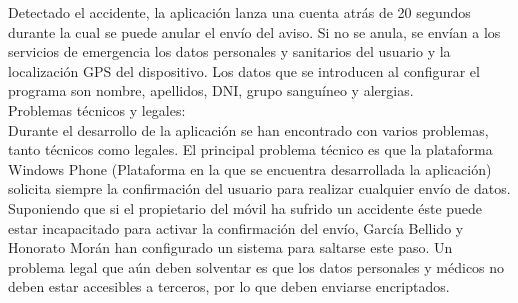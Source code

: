 Detectado el accidente, la aplicación lanza una cuenta atrás de 20 segundos durante la cual se puede anular el envío del aviso. Si no se anula, se envían a los servicios de emergencia los datos personales y sanitarios del usuario y la localización GPS del dispositivo. Los datos que se introducen al configurar el programa son nombre, apellidos, DNI, grupo sanguíneo y alergias.\\

Problemas técnicos y legales:\\

Durante el desarrollo de la aplicación se han encontrado con varios problemas, tanto técnicos como legales. El principal problema técnico es que la plataforma Windows Phone (Plataforma en la que se encuentra desarrollada la aplicación) solicita siempre la confirmación del usuario para realizar cualquier envío de datos. Suponiendo que si el propietario del móvil ha sufrido un accidente éste puede estar incapacitado para activar la confirmación del envío, García Bellido y Honorato Morán han configurado un sistema para saltarse este paso. Un problema legal que aún deben solventar es que los datos personales y médicos no deben estar accesibles a terceros, por lo que deben enviarse encriptados.


